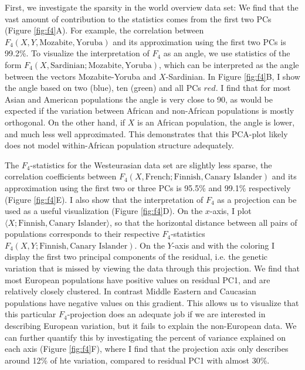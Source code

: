 \documentclass[12pt,a4pape, fullpage]{article}
\begin{document}
First, we investigate the sparsity in the world overview data set: We find that the vast amount of contribution to the statistics comes from the first two PCs (Figure \ref{fig:f4}A). For example, the correlation between $F_4(X, Y, \text{Mozabite}, \text{Yoruba})$ and its approximation using the first two PCs is 99.2\%. To visualize the interpretation of $F_4$ as an angle, we use statistics of the form $F_4(X, \text{Sardinian}; \text{Mozabite}, \text{Yoruba})$, which can be interpreted as the angle between the vectors Mozabite-Yoruba and $X$-Sardinian. In Figure \ref{fig:f4}B, I show the angle based on two (blue), ten (green) and all PCs $red$. I find that for most Asian and American populations the angle is very close to 90\textdegree, as would be expected if the variation between African and non-African populations is mostly orthogonal. On the other hand, if $X$ is an African population, the angle is lower, and much less well approximated. This demonstrates that this PCA-plot likely does not model within-African population structure adequately. 

The $F_4$-statistics for the Westeurasian data set are slightly less sparse, the correlation coefficients between $F_4(X, \text{French}; \text{Finnish}, \text{Canary Islander})$ and its approximation using the first two or three PCs is 95.5\% and 99.1\% respectively (Figure \ref{fig:f4}E). I also show that the interpretation of $F_4$ as a projection can be used as a useful visualization (Figure \ref{fig:f4}D). On the $x$-axis, I plot $\langle X; \text{Finnish}, \text{Canary Islander}\rangle$, so that the horizontal distance between all pairs of populations corresponds to their respective $F_4$-statistics $F_4(X, Y; \text{Finnish}, \text{Canary Islander})$. On the $Y$-axis and with the coloring I display the first two principal components of the residual, i.e. the genetic variation that is missed by viewing the data through this projection. We find that most European populations have positive values on residual PC1, and are relatively closely clustered. In contrast Middle Eastern and Caucasian populations have negative values on this gradient. This allows us to visualize that this particular $F_4$-projection does an adequate job if we are interested in describing European variation, but it fails to explain the non-European data. We can further quantify this by investigating the percent of variance explained on each axis (Figure \ref{fig:f4}F), where I find that the projection axis only describes around 12\% of hte variation, compared to residual PC1 with almost 30\%.
\end{document}
